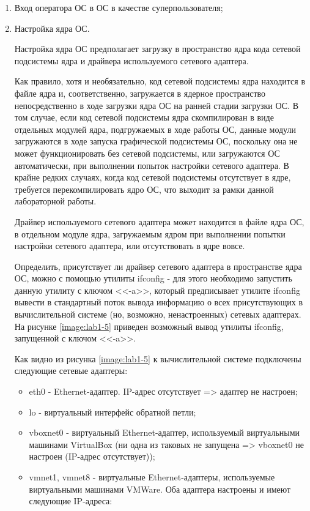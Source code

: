 	\begin{enumerate}

		\item Вход оператора ОС в ОС в качестве суперпользователя;

		\item Настройка ядра ОС.

		Настройка ядра ОС предполагает загрузку в пространство ядра кода сетевой подсистемы ядра
		и драйвера используемого сетевого адаптера.
		
		Как правило, хотя и необязательно, код сетевой подсистемы ядра находится в файле ядра и,
		соответственно, загружается в ядерное пространство непосредственно в ходе загрузки ядра ОС на
		ранней стадии загрузки ОС. В том случае, если код сетевой подсистемы ядра скомпилирован в виде отдельных
		модулей ядра, подгружаемых в ходе работы ОС, данные модули загружаются в ходе запуска графической подсистемы
		ОС, поскольку она не может функционировать без сетевой подсистемы, или загружаются ОС автоматически,
		при выполнении попыток настройки сетевого адаптера. В крайне редких случаях, когда код сетевой подсистемы
		отсутствует в ядре, требуется перекомпилировать ядро ОС, что выходит за рамки данной лабораторной работы.

		Драйвер используемого сетевого адаптера может находится в файле ядра ОС, в отдельном модуле ядра,
		загружаемым ядром при выполнении попытки настройки сетевого адаптера, или отсутствовать в ядре вовсе.

		Определить, присутствует ли драйвер сетевого адаптера в пространстве ядра ОС, можно с помощью утилиты
		ifconfig - для этого необходимо запустить данную утилиту с ключом <<-a>>, который предписывает утилите
		ifconfig вывести в стандартный поток вывода информацию о всех присутствующих в вычислительной системе
		(но, возможно, ненастроенных) сетевых адаптерах.
		На рисунке \ref{image:lab1-5} приведен возможный вывод утилиты ifconfig, запущенной с ключом <<-a>>.


		Как видно из рисунка \ref{image:lab1-5} к вычислительной системе подключены следующие сетевые адаптеры:

		\begin{itemize}

			\item eth0 - Ethernet-адаптер. IP-адрес отсутствует => адаптер не настроен;
			\item lo - виртуальный интерфейс обратной петли;
			\item vboxnet0 - виртуальный Ethernet-адаптер, используемый виртуальными машинами VirtualBox
				  (ни одна из таковых не запущена => vboxnet0 не настроен (IP-адрес отсутствует));
			\item vmnet1, vmnet8 - виртуальные Ethernet-адаптеры, используемые виртуальными машинами VMWare.
			Оба адаптера настроены и имеют следующие IP-адреса:


\end{itemize}
\end{enumerate}
